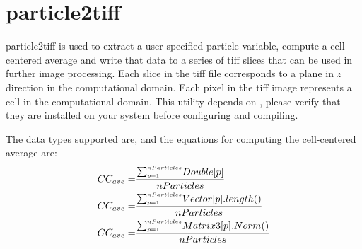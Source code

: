 \section{particle2tiff}
particle2tiff is used to extract a user specified particle variable,
compute a cell centered average and write that data to a series of tiff
slices that can be used in further image processing.  Each slice in the tiff
file corresponds to a plane in $z$ direction in the computational domain.
Each pixel in the tiff image represents a cell in the computational domain.
This utility depends on , please
verify that they are installed on your system before configuring and compiling.



The data types supported are, and the equations for computing the cell-centered average are:
\begin{eqnarray}
  CC_{ave} =& {\raise1.5pt\hbox{$\scriptstyle\sum_{p=1}^{nParticles}$}} Double[p]          \over {nParticles} \nonumber \\
  CC_{ave} =& {\raise1.5pt\hbox{$\scriptstyle\sum_{p=1}^{nParticles}$}} Vector[p].length() \over {nParticles} \nonumber \\
  CC_{ave} =& {\raise1.5pt\hbox{$\scriptstyle\sum_{p=1}^{nParticles}$}} Matrix3[p].Norm()  \over {nParticles}\nonumber
\end{eqnarray}

